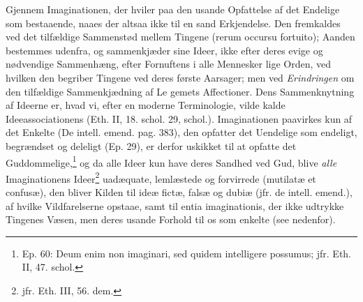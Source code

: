 \documentclass[12pt,a4paper]{book}
\newcommand{\opage}[1]{\marginnote{\footnotesize\textit{[#1]}}}
\begin{document}
Gjennem Imaginationen, der hviler paa den usande Opfattelse af
det Endelige som bestaaende, naaes der altsaa ikke til en sand
Erkjendelse. Den fremkaldes ved det tilfældige Sammenstød
mellem Tingene (rerum occursu fortuito); Aanden bestemmes
udenfra, og sammenkjæder sine Ideer, ikke efter deres evige og
nødvendige Sammenhæng, efter Fornuftens i alle Mennesker lige
Orden, ved hvilken den begriber Tingene ved deres første
Aarsager; men ved \emph{Erindringen} om den tilfældige Sammenkjædning
af Le\-%
\opage{91}\setcounter{footnote}{0}%
gemets Affectioner. Dens Sammenknytning af Ideerne er, hvad
vi, efter en moderne Terminologie, vilde kalde
Ideeassociationens (Eth. II, 18. schol. 29, schol.).
Imaginationen paavirkes kun af det Enkelte (De intell. emend.
pag. 383), den opfatter det Uendelige som endeligt, begrændset
og deleligt (Ep. 29), er derfor uskikket til at opfatte det
Guddommelige,\footnote{Ep. 60: Deum enim non imaginari, sed
quidem intelligere possumus; jfr. Eth. II, 47. schol.} og da
alle Ideer kun have deres Sandhed ved Gud, blive \emph{alle}
Imaginationens Ideer\footnote{jfr. Eth. III, 56. dem.}
uadæquate, lemlæstede og forvirrede (mutilatæ et confusæ), den
bliver Kilden til ideæ fictæ, falsæ og dubiæ (jfr. de intell.
emend.), af hvilke Vildfarelserne opstaae, samt til entia
imaginationis, der ikke udtrykke Tingenes Væsen, men deres
usande Forhold til os som enkelte (see nedenfor).
\end{document}
